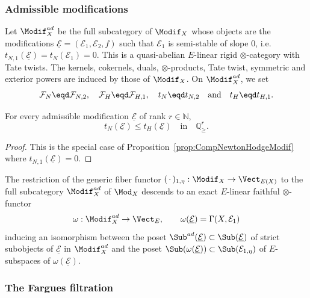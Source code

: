 \subsubsection{Admissible modifications}\label{subsec:AdmModifDef}

Let $\Modif_{X}^{ad}$ be the full subcategory of $\Modif_{X}$ whose objects are the modifications $\underline{\mathcal{E}}=(\mathcal{E}_{1},\mathcal{E}_{2},f)$ such that $\mathcal{E}_{1}$ is semi-stable of slope $0$, i.e.~$t_{N,1}(\underline{\mathcal{E}})=t_{N}(\mathcal{E}_{1})=0$. This is a quasi-abelian $E$-linear rigid $\otimes$-category with Tate twists. The kernels, cokernels, duals, $\otimes$-products, Tate twist, symmetric and exterior powers are induced by those of $\Modif_{X}$. On $\Modif_{X}^{ad}$, we set
\[
\mathcal{F}_{N}\eqd\mathcal{F}_{N,2},\quad\mathcal{F}_{H}\eqd\mathcal{F}_{H,1},\quad t_{N}\eqd t_{N,2}\quad\text{and}\quad t_{H}\eqd t_{H,1}.
\]

\begin{prop}\label{prop:OnAdmModif_NewtonHodge}
For every admissible modification $\underline{\mathcal{E}}$ of rank $r\in\mathbb{N}$,
\[
t_{N}(\underline{\mathcal{E}})\leq t_{H}(\underline{\mathcal{E}})\quad\text{in}\quad\mathbb{Q}_{\geq}^{r}.
\]
\end{prop}

\begin{proof}
This is the special case of Proposition~\ref{prop:CompNewtonHodgeModif} where $t_{N,1}(\underline{\mathcal{E}})=0$.
\end{proof}

The restriction of the generic fiber functor $({\,\cdot\,})_{1,\eta}:\Modif_{X}\rightarrow\Vect_{E(X)}$ to the full subcategory $\Modif_{X}^{ad}$ of $\Mod_{X}$ descends to an exact $E$-linear faithful $\otimes$-functor
\[
\omega:\Modif_{X}^{ad}\rightarrow\Vect_{E},\qquad\omega(\underline{\mathcal{E}})=\Gamma(X,\mathcal{E}_{1})
\]
inducing an isomorphism between the poset $\Sub^{ad}(\underline{\mathcal{E}})\subset\Sub(\underline{\mathcal{E}})$ of strict subobjects of $\underline{\mathcal{E}}$ in $\Modif_{X}^{ad}$ and the poset $\Sub(\omega(\underline{\mathcal{E}}))\subset\Sub(\mathcal{E}_{1,\eta})$ of $E$-subspaces of $\omega(\underline{\mathcal{E}})$.

\subsubsection{The Fargues filtration}\label{subsec:DefFarguesFiltrOnModif}

